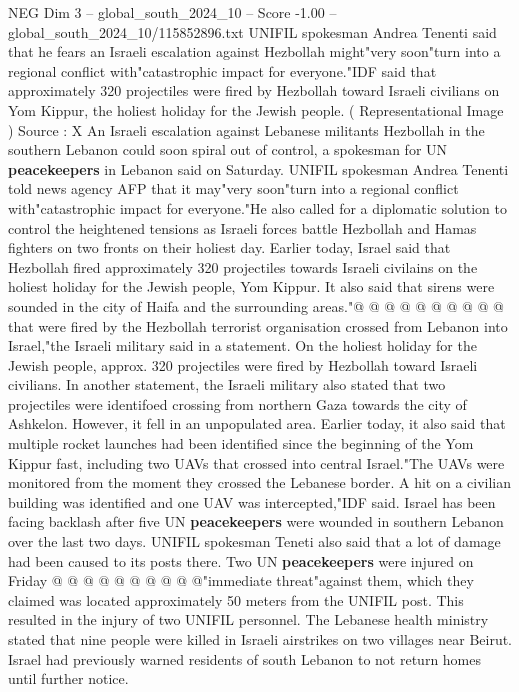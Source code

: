 \begin{textsample}{NEG Dim 3 – global\_south\_2024\_10 – Score -1.00 – global\_south\_2024\_10/115852896.txt}  \label{ex:f3_neg_052}
UNIFIL spokesman Andrea Tenenti said that he fears an Israeli escalation against Hezbollah might"very soon"turn into a regional conflict with"catastrophic impact for everyone."IDF said that approximately 320 projectiles were fired by Hezbollah toward Israeli civilians on Yom Kippur, the holiest holiday for the Jewish people. ( Representational Image ) Source : X An Israeli escalation against Lebanese militants Hezbollah in the southern Lebanon could soon spiral out of control, a spokesman for UN \textbf{peacekeepers} in Lebanon said on Saturday.
UNIFIL spokesman Andrea Tenenti told news agency AFP that it may"very soon"turn into a regional conflict with"catastrophic impact for everyone."He also called for a diplomatic solution to control the heightened tensions as Israeli forces battle Hezbollah and Hamas fighters on two fronts on their holiest day.
Earlier today, Israel said that Hezbollah fired approximately 320 projectiles towards Israeli civilains on the holiest holiday for the Jewish people, Yom Kippur.
It also said that sirens were sounded in the city of Haifa and the surrounding areas."@ @ @ @ @ @ @ @ @ @ that were fired by the Hezbollah terrorist organisation crossed from Lebanon into Israel,"the Israeli military said in a statement.
On the holiest holiday for the Jewish people, approx. 320 projectiles were fired by Hezbollah toward Israeli civilians.
In another statement, the Israeli military also stated that two projectiles were identifoed crossing from northern Gaza towards the city of Ashkelon.
However, it fell in an unpopulated area.
Earlier today, it also said that multiple rocket launches had been identified since the beginning of the Yom Kippur fast, including two UAVs that crossed into central Israel."The UAVs were monitored from the moment they crossed the Lebanese border.
A hit on a civilian building was identified and one UAV was intercepted,"IDF said.
Israel has been facing backlash after five UN \textbf{peacekeepers} were wounded in southern Lebanon over the last two days.
UNIFIL spokesman Teneti also said that a lot of damage had been caused to its posts there.
Two UN \textbf{peacekeepers} were injured on Friday @ @ @ @ @ @ @ @ @ @"immediate threat"against them, which they claimed was located approximately 50 meters from the UNIFIL post.
This resulted in the injury of two UNIFIL personnel.
The Lebanese health ministry stated that nine people were killed in Israeli airstrikes on two villages near Beirut.
Israel had previously warned residents of south Lebanon to not return homes until further notice.

\end{textsample}
